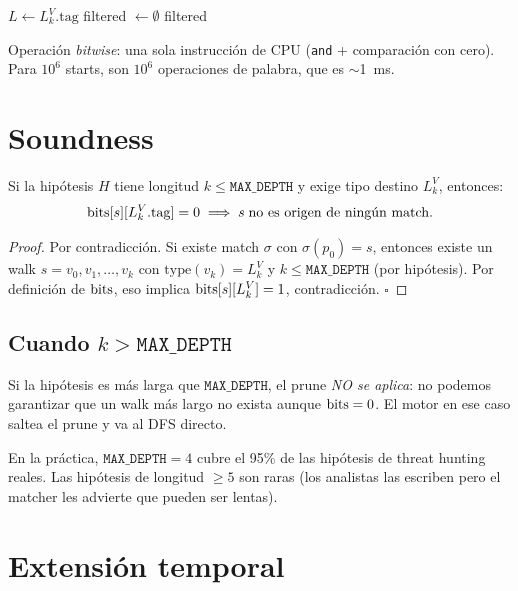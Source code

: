 \begin{algorithm}[H]
\caption{Prune k-hop al inicio del DFS}
\(L \leftarrow L_k^V.\mathrm{tag}\)\;
filtered \(\leftarrow \emptyset\)\;
\Return filtered\;
\end{algorithm}

\noindent
Operación \emph{bitwise}: una sola instrucción de CPU
(\texttt{and} + comparación con cero). Para \(10^6\) starts, son
\(10^6\) operaciones de palabra, que es $\sim$1~ms.

\section{Soundness}

\begin{theorem}
Si la hipótesis \(H\) tiene longitud \(k \leq \texttt{MAX\_DEPTH}\)
y exige tipo destino \(L_k^V\), entonces:
\[
\mathrm{bits}[s][L_k^V.\mathrm{tag}] = 0 \implies s\;\text{no es origen de ningún match}.
\]
\end{theorem}

\begin{proof}
Por contradicción. Si existe match \(\sigma\) con \(\sigma(p_0) =
s\), entonces existe un walk \(s = v_0, v_1, \dots, v_k\) con
\(\mathrm{type}(v_k) = L_k^V\) y \(k \leq \texttt{MAX\_DEPTH}\)
(por hipótesis). Por definición de \(\mathrm{bits}\), eso implica
\(\mathrm{bits}[s][L_k^V] = 1\), contradicción. \(\square\)
\end{proof}

\subsection{Cuando \(k > \texttt{MAX\_DEPTH}\)}

Si la hipótesis es más larga que \(\texttt{MAX\_DEPTH}\), el prune
\emph{NO se aplica}: no podemos garantizar que un walk más largo no
exista aunque \(\mathrm{bits} = 0\). El motor en ese caso saltea el prune
y va al DFS directo.

En la práctica, \(\texttt{MAX\_DEPTH} = 4\) cubre el 95\% de las
hipótesis de threat hunting reales. Las hipótesis de longitud
\(\geq 5\) son raras (los analistas las escriben pero el matcher
les advierte que pueden ser lentas).

\section{Extensión temporal}

